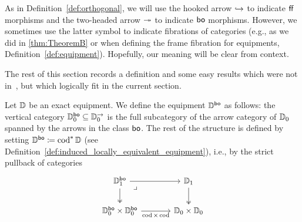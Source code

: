 \documentclass[11pt,oneside,article]{memoir}
\begin{document}
\begin{remark}
   As in Definition~\ref{def:orthogonal}, we will use the hooked arrow $\hookrightarrow$ to indicate $\mathsf{ff}$
   morphisms and the two-headed arrow $\twoheadrightarrow$ to indicate $\mathsf{bo}$ morphisms. However, we sometimes use
   the latter symbol to indicate fibrations of categories (e.g., as we did in \ref{thm:TheoremB} or
   when defining the frame fibration for equipments, Definition~\ref{def:equipment}). Hopefully, our
   meaning will be clear from context.
\end{remark}

The rest of this section records a definition and some easy results which were not
in~\cite{Schultz2015}, but which logically fit in the current section.

\begin{definition}
   Let $\mathbb{D}$ be an exact equipment. We define the equipment $\mathbb{D}^{\mathsf{bo}}$ as follows: the
   vertical category $\mathbb{D}_0^{\mathsf{bo}}\subseteq\mathbb{D}_0^{\rightarrow}$ is the full subcategory of the arrow category of
   $\mathbb{D}_0$ spanned by the arrows in the class $\mathsf{bo}$. The rest of the structure is defined by
   setting $\mathbb{D}^{\mathsf{bo}}\coloneqq\operatorname{cod}^*\mathbb{D}$ (see
   Definition~\ref{def:induced_locally_equivalent_equipment}), i.e., by the strict pullback of categories
   \[ \begin{tikzcd}[column sep=large]
      \dcat{D}_1^{\bo} \ar[r] \ar[d, two heads] \ar[dr,phantom,"\lrcorner" very near start]
         & \dcat{D}_1 \ar[d, two heads] \\
      \dcat{D}_0^{\bo}\times\dcat{D}_0^{\bo} \ar[r,"\cod\times\cod"']
         & \dcat{D}_0\times\dcat{D}_0
   \end{tikzcd} \]
\end{definition}
\end{document}

